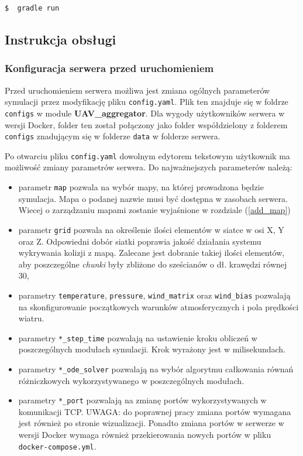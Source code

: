 \documentclass[15pt]{sprawozdanie}
\begin{document}
\begin{lstlisting}[language=bash]
  $  gradle run 
\end{lstlisting}  

\newpage

\subsection{Instrukcja obsługi} \label{manual}

\subsubsection{Konfiguracja serwera przed uruchomieniem}

Przed uruchomieniem serwera możliwa jest zmiana ogólnych parameterów symulacji przez modyfikację pliku \texttt{config.yaml}. Plik ten znajduje się w foldrze \texttt{configs} w module \textbf{UAV\_aggregator}. Dla wygody użytkowników serwera w wersji Docker, folder ten został połączony jako folder współdzielony z folderem \texttt{configs} znadującym się w folderze \texttt{data} w folderze serwera.

Po otwarciu pliku \texttt{config.yaml} dowolnym edytorem tekstowym użytkownik ma możliwość zmiany parametrów serwera. Do najważnejszych parameterów należą:
 \begin{itemize}
\item parametr \texttt{map} pozwala na wybór mapy, na której prowadzona będzie symulacja. Mapa o podanej nazwie musi być dostępna w zasobach serwera. Wiecej o zarządzaniu mapami zostanie wyjaśnione w rozdziale (\ref{add_map})
\item parametr \texttt{grid} pozwala na określenie ilości elementów w siatce w osi X, Y oraz Z. Odpowiedni dobór siatki poprawia jakość działania systemu wykrywania kolizji z mapą. Zalecane jest dobranie takiej ilości elementów, aby poszczególne \textit{chunki} były zbliżone do sześcianów o dł. krawędzi równej 30,
\item parametry \texttt{temperature}, \texttt{pressure}, \texttt{wind\_matrix} oraz \texttt{wind\_bias} pozwalają na skonfigurowanie początkowych warunków atmosferycznych i pola prędkości wiatru. 
\item parametry \texttt{*\_step\_time} pozwalają na ustawienie kroku obliczeń w poszczególnych modułach symulacji. Krok wyrażony jest w milisekundach.
\item parametry \texttt{*\_ode\_solver} pozwalają na wybór algorytmu całkowania równań różniczkowych wykorzystywanego w poszczególnych modułach.
\item parametry \texttt{*\_port} pozwalają na zmianę portów wykorzystywanych w komunikacji TCP. UWAGA: do poprawnej pracy zmiana portów wymagana jest również po stronie wizualizacji. Ponadto zmiana portów w serwerze w wersji Docker wymaga również przekierowania nowych portów w pliku \texttt{docker-compose.yml}.
\end{itemize}
\end{document}
